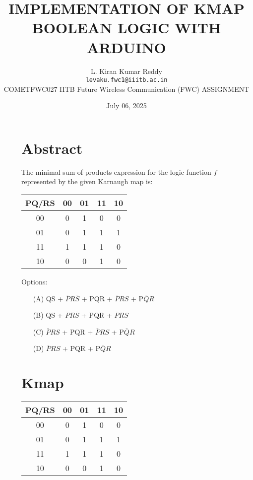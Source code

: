 \documentclass[12pt,a4paper]{article}
\title{\textbf{IMPLEMENTATION OF KMAP BOOLEAN LOGIC WITH ARDUINO}}
\author{L. Kiran Kumar Reddy \\ \texttt{levaku.fwc1@iiitb.ac.in} \\
 \hspace{-0.3cm}COMETFWC027\hspace{0.5cm} IITB Future Wireless Communication (FWC)\hspace{0.4cm} ASSIGNMENT}
\date{July 06, 2025}
\begin{document}
\maketitle

\begin{figure}[H]
  \centering
  \begin{minipage}[t]{0.48\textwidth}
    \section*{Abstract}
    \small
    The minimal sum-of-products expression for the logic function $f$ represented by the given Karnaugh map is:

    \vspace{0.3cm}

    \renewcommand{\arraystretch}{1.3}
    \begin{tabular}{c|c|c|c|c}
      PQ/RS & 00 & 01 & 11 & 10 \\ \hline
      00 & 0 & 1 & 0 & 0 \\ \hline
      01 & 0 & 1 & 1 & 1 \\ \hline
      11 & 1 & 1 & 1 & 0 \\ \hline
      10 & 0 & 0 & 1 & 0 \\
    \end{tabular}

    \vspace{0.3cm}

    Options:
    \begin{enumerate}
      \item[(A)] QS + $\overline{P}R\overline{S}$ + PQR + $\overline{P}RS$ + P$\overline{Q}R$
      \item[(B)] QS + $\overline{P}R\overline{S}$ + PQR + $\overline{P}RS$
      \item[(C)] $\overline{P}RS$ + PQR + $\overline{P}RS$ + P$\overline{Q}R$
      \item[(D)] $\overline{P}RS$ + PQR + P$\overline{Q}R$
    \end{enumerate}

    \vspace{0.5cm}

    \section*{Kmap}

   \renewcommand{\arraystretch}{1.3}
    \begin{tabular}{c|c|c|c|c}
      PQ/RS & 00 & 01 & 11 & 10 \\ \hline
      00 & 0 & 1 & 0 & 0 \\ \hline
      01 & 0 & 1 & 1 & 1 \\ \hline
      11 & 1 & 1 & 1 & 0 \\ \hline
      10 & 0 & 0 & 1 & 0 \\
    \end{tabular}


\end{minipage}
\end{figure}
\end{document}
